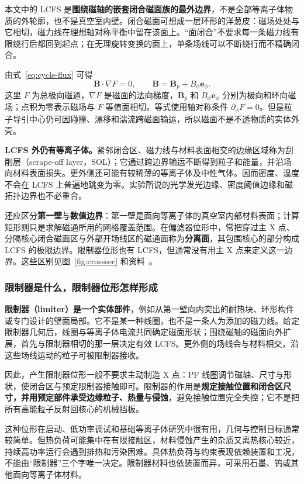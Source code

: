 \documentclass[12pt,fontset=none]{ctexart}
\numberwithin{equation}{section}
\numberwithin{table}{section}
\numberwithin{figure}{section}
\begin{document}
本文中的 LCFS 是\textbf{围绕磁轴的嵌套闭合磁面族的最外边界}，不是全部等离子体物质的外轮廓，也不是真空室内壁。闭合磁面可想成一层环形的洋葱皮：磁场处处与它相切，磁力线在理想轴对称平衡中留在该面上。``面闭合''不要求每一条磁力线有限绕行后都回到起点；在无理旋转变换的面上，单条场线可以不断绕行而不精确闭合。

由式~\eqref{eq:cycle-flux} 可得
\begin{equation}\label{eq:edge-flux-tangent}
 \bm B\cdot\nabla F=0,\qquad
 \bm B=\bm B_p+B_\phi\bm e_\phi .
\end{equation}
这里 $F$ 为总极向磁通，$\nabla F$ 是磁面的法向梯度，$\bm B_p$ 和 $B_\phi\bm e_\phi$ 分别为极向和环向磁场；点积为零表示磁场与 $F$ 等值面相切。等式使用轴对称条件 $\partial_\phi F=0$。但是粒子导引中心仍可因碰撞、漂移和湍流跨磁面输运，所以磁面不是不透物质的实体外壳。

\textbf{LCFS 外仍有等离子体。}紧邻闭合区、磁力线与材料表面相交的边缘区域称为刮削层（scrape-off layer，SOL）；它通过跨边界输运不断得到粒子和能量，并沿场向材料表面损失。更外侧还可能有较稀薄的等离子体及中性气体。因而密度、温度不会在 LCFS 上普遍地跳变为零。实验所说的光学发光边缘、密度阈值边缘和磁拓扑边界也不必重合。

还应区分\textbf{第一壁}与\textbf{数值边界}：第一壁是面向等离子体的真空室内部材料表面；计算矩形则只是求解磁通所用的网格覆盖范围。在偏滤器位形中，常把穿过主 X 点、分隔核心闭合磁面区与外部开场线区的磁通面称为\textbf{分离面}，其包围核心的部分构成 LCFS 的极限边界。限制器位形也有 LCFS，但通常没有用主 X 点来定义这一边界。这些区别见图~\ref{fig:crosssec} 和资料~\cite{C6}。

\subsubsection{限制器是什么，限制器位形怎样形成}

\textbf{限制器（limiter）是一个实体部件}，例如从第一壁向内突出的耐热块、环形构件或专门设计的壁面局部。它不是某一种线圈，也不是一条人为添加的磁力线。给定限制器几何后，线圈与等离子体电流共同确定磁面形状；围绕磁轴的磁面向外扩展，首先与限制器相切的那一层决定有效 LCFS。更外侧的场线会与材料相交，沿这些场线运动的粒子可被限制器接收。

因此，产生限制器位形一般不要求主动制造 X 点：PF 线圈调节磁轴、尺寸与形状，使闭合区与预定限制器接触即可。限制器的作用是\textbf{规定接触位置和闭合区尺寸，并用预定部件承受边缘粒子、热量与侵蚀}，避免接触位置完全失控；它不是把所有高能粒子反射回核心的机械挡板。

这种位形在启动、低功率调试和基础等离子体研究中很有用，几何与控制目标通常较简单。但热负荷可能集中在有限接触区，材料侵蚀产生的杂质又离热核心较近，持续高功率运行会遇到排热和污染困难。具体热负荷与约束表现依赖装置和工况，不能由``限制器''三个字唯一决定。限制器材料也依装置而异，可采用石墨、钨或其他面向等离子体材料。
\end{document}
